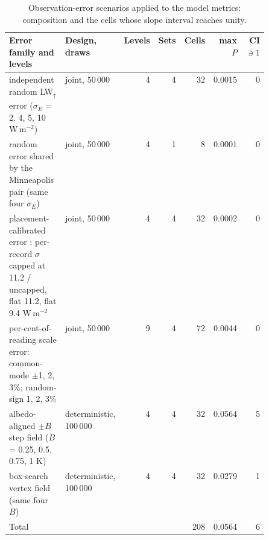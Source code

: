 \begin{table}[!tbp]
\centering\footnotesize
\caption{Observation-error scenarios applied to the model metrics: composition and the cells whose slope interval reaches unity.}
\label{tab:scenarios}
\setlength{\tabcolsep}{3pt}
\scriptsize
\begin{tabular}{@{}p{0.50\linewidth}lrrrrr@{}}
\toprule
Error family and levels & Design, draws & Levels & Sets & Cells & max $P$ & CI $\ni 1$ \\
\midrule
independent random LW$_{\uparrow}$ error ($\sigma_E$ = 2, 4, 5, 10 W\,m$^{-2}$) & joint, 50\,000 & 4 & 4 & 32 & 0.0015 & 0 \\
random error shared by the Minneapolis pair (same four $\sigma_E$) & joint, 50\,000 & 4 & 1 & 8 & 0.0001 & 0 \\
placement-calibrated error \citep{Adderley2015}: per-record $\sigma$ capped at 11.2 / uncapped, flat 11.2, flat 9.4 W\,m$^{-2}$ & joint, 50\,000 & 4 & 4 & 32 & 0.0002 & 0 \\
per-cent-of-reading scale error: common-mode $\pm$1, 2, 3\%; random-sign 1, 2, 3\% & joint, 50\,000 & 9 & 4 & 72 & 0.0044 & 0 \\
albedo-aligned $\pm B$ step field ($B$ = 0.25, 0.5, 0.75, 1 K) & deterministic, 100\,000 & 4 & 4 & 32 & 0.0564 & 5 \\
box-search vertex field (same four $B$) & deterministic, 100\,000 & 4 & 4 & 32 & 0.0279 & 1 \\
\midrule
Total & & & & 208 & 0.0564 & 6 \\
\bottomrule
\end{tabular}
\par{}
\end{table}

